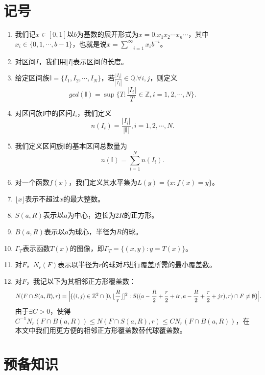 \cleardoublepage

\section{记号}

\begin{enumerate}
      \item 我们记$x\in[0,1]$以$b$为基数的展开形式为$x=0.x_1x_2\cdots x_n\cdots$，其中$x_i\in\{0,1,\cdots,b-1\}$，也就是说$x=\underset{i=1}{\overset{\infty}{\sum}}x_ib^{-i}$。
      \item 对区间$I$，我们用$|I|$表示区间的长度。
      \item 给定区间族$\mathbb{I}=\{I_1,I_2,\cdots,I_N\}$，若$\frac{|I_i|}{|I_j|}\in\mathbb{Q}.\forall i,j$，则定义
      $$
            gcd(\mathbb{I})=\sup\{T:\frac{|I_i|}{T}\in\mathbb{Z},i=1,2,\cdots,N\}.
      $$
      \item 对区间族$\mathbb{I}$中的区间$I_i$，我们定义
      $$
            n(I_i)=\frac{|I_i|}{|\mathbb{I}|},i=1,2,\cdots,N.
      $$
      \item 我们定义区间族$\mathbb{I}$的基本区间总数量为
      $$
            n(\mathbb{I})=\sum_{i=1}^Nn(I_i).
      $$
      \item 对一个函数$f(x)$，我们定义其水平集为$L(y)=\{x:f(x)=y\}$。
      \item $\lfloor x \rfloor$表示不超过$x$的最大整数。
      \item $S(a,R)$表示以$a$为中心，边长为$2R$的正方形。
      \item $B(a,R)$表示以$a$为球心，半径为$R$的球。
      \item $\Gamma_T$表示函数$T(x)$的图像，即$\Gamma_T=\{(x,y):y=T(x)\}$。
      \item 对$F$，$N_r(F)$表示以半径为$r$的球对$F$进行覆盖所需的最小覆盖数。
      \item 对$F$，我记以下为其相邻正方形覆盖数：
      $$
            N(F\cap S(a,R),r)=\Big|\{(i,j)\in\mathbb{Z}^2\cap[0,\lfloor\frac{R}{r}\rfloor]^2:\\
                  S((a-\frac{R}{2}+\frac{r}{2}+ir,a-\frac{R}{2}+\frac{r}{2}+jr),r)\cap F\neq\emptyset\}\Big|.
      $$
      由于$\exists C>0$，使得$C^{-1}N_r(F\cap B(a,R))\le N(F\cap S(a,R),r)\le CN_r(F\cap B(a,R))$，在本文中我们用更方便的相邻正方形覆盖数替代球覆盖数。
\end{enumerate}

\section{预备知识}
